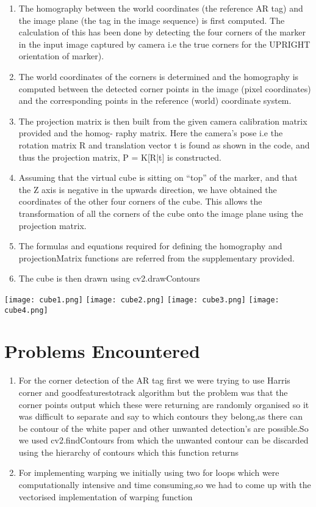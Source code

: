 \documentclass{article}
\begin{document}
\begin{enumerate}
    \item The homography between the world coordinates (the reference AR tag) and the image plane (the tag in the image sequence) is first computed. The calculation of this has been done by detecting the four corners of the marker in the input image captured by camera i.e the true corners for the UPRIGHT orientation of marker).
    \item The world coordinates of the corners is determined and the homography is computed between the detected corner points in the image (pixel coordinates) and the corresponding points in the reference (world) coordinate system.
    \item The projection matrix is then built from the given camera calibration matrix provided and the homog- raphy matrix. Here the camera’s pose i.e the rotation matrix R and translation vector t is found as shown in the code, and thus the projection matrix, P = K[R|t] is constructed.
    \item Assuming that the virtual cube is sitting on “top” of the marker, and that the Z axis is negative in the upwards direction, we have obtained the coordinates of the other four corners of the cube. This allows the transformation of all the corners of the cube onto the image plane using the projection matrix.
    \item The formulas and equations required for defining the homography and projectionMatrix functions are
referred from the supplementary provided.
    \item The cube is then drawn using cv2.drawContours
\end{enumerate}
\begin{center}

    \texttt{[image: cube1.png]}
    \texttt{[image: cube2.png]}
    \texttt{[image: cube3.png]}
    \texttt{[image: cube4.png]}
    

    
\end{center}
\section{Problems Encountered}
\begin{enumerate}
    \item For the corner detection of the AR tag first we were trying to use Harris corner and goodfeaturestotrack algorithm but the problem was that the corner points output which these were returning are randomly organised so it was difficult to separate and say to which contours they belong,as there can be contour of the white paper and other unwanted detection's are possible.So we used cv2.findContours from which the unwanted contour can be discarded using the hierarchy of contours which this function returns
    
    \item For implementing warping we initially using two for loops which were computationally intensive and time consuming,so we had to come up with the vectorised implementation of warping function
 
\end{enumerate}
\end{document}
